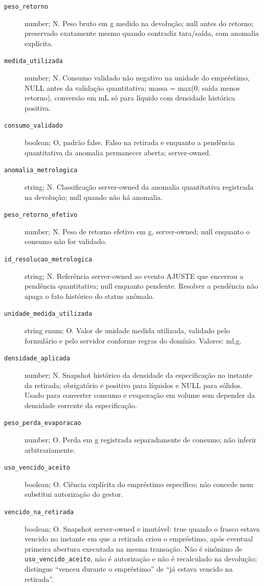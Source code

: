 \begin{description}
\item[\texttt{peso\_retorno}] number; N. Peso bruto em g medido na devolução; null antes do retorno; preservado exatamente mesmo quando contradiz tara/saída, com anomalia explícita.
\item[\texttt{medida\_utilizada}] number; N. Consumo validado não negativo na unidade do empréstimo, NULL antes da validação quantitativa; massa = max(0, saída menos retorno), conversão em mL só para líquido com densidade histórica positiva.
\item[\texttt{consumo\_validado}] boolean; O, padrão false. Falso na retirada e enquanto a pendência quantitativa da anomalia permanecer aberta; server-owned.
\item[\texttt{anomalia\_metrologica}] string; N. Classificação server-owned da anomalia quantitativa registrada na devolução; null quando não há anomalia.
\item[\texttt{peso\_retorno\_efetivo}] number; N. Peso de retorno efetivo em g, server-owned; null enquanto o consumo não for validado.
\item[\texttt{id\_resolucao\_metrologica}] string; N. Referência server-owned ao evento AJUSTE que encerrou a pendência quantitativa; null enquanto pendente. Resolver a pendência não apaga o fato histórico do status anômalo.
\item[\texttt{unidade\_medida\_utilizada}] string enum; O. Valor de unidade medida utilizada, validado pelo formulário e pelo servidor conforme regras do domínio. Valores: ml,g.
\item[\texttt{densidade\_aplicada}] number; N. Snapshot histórico da densidade da especificação no instante da retirada; obrigatório e positivo para líquidos e NULL para sólidos. Usado para converter consumo e evaporação em volume sem depender da densidade corrente da especificação.
\item[\texttt{peso\_perda\_evaporacao}] number; O. Perda em g registrada separadamente de consumo; não inferir arbitrariamente.
\item[\texttt{uso\_vencido\_aceito}] boolean; O. Ciência explícita do empréstimo específico; não concede nem substitui autorização do gestor.
\item[\texttt{vencido\_na\_retirada}] boolean; O. Snapshot server-owned e imutável: true quando o frasco estava vencido no instante em que a retirada criou o empréstimo, após eventual primeira abertura executada na mesma transação. Não é sinônimo de \texttt{uso\_vencido\_aceito}, não é autorização e não é recalculado na devolução; distingue ``venceu durante o empréstimo'' de ``já estava vencido na retirada''.

\end{description}
